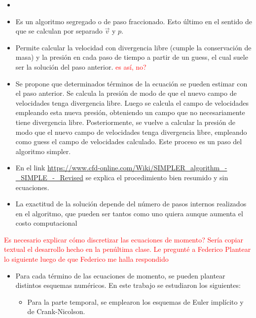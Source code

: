 \documentclass[aps,prb,twocolumn,superscriptaddress,floatfix,longbibliography,10pt]{revtex4-2}
\newif\ifptitle
\newif\ifpnumber
\newcounter{para}
\newcommand\ptitle[1]{\par\refstepcounter{para}
{\ifpnumber{\noindent\textcolor{lightgray}{\textbf{\thepara}}\indent}\fi}
{\ifptitle{\textbf{[{#1}]}}\fi}}
\begin{document}
\ptitle{Algoritmo simpler simplificadamente}
\begin{itemize}
  \item \cite{Patankar}
  \item Es un algoritmo segregado o de paso fraccionado. Esto último en el sentido de que se calculan por separado $\vec{v}$ y $p$.
  \item Permite calcular la velocidad con divergencia libre (cumple la conservación de masa) y la presión en cada paso de tiempo a partir de un guess, el cual suele ser la solución del paso anterior. \textcolor{red}{es así, no?}
  \item Se propone que determinados términos de la ecuación se pueden estimar con el paso anterior. Se calcula la presión de modo de que el nuevo campo de velocidades tenga divergencia libre. Luego se calcula el campo de velocidades empleando esta nueva presión, obteniendo un campo que no necesariamente tiene divergencia libre. Posteriormente, se vuelve a calcular la presión de modo que el nuevo campo de velocidades tenga divergencia libre, empleando como guess el campo de velocidades calculado. Este proceso es un paso del algoritmo simpler.
  \item En el link \url{https://www.cfd-online.com/Wiki/SIMPLER_algorithm_-_SIMPLE_-_Revised} se explica el procedimiento bien resumido y sin ecuaciones.
  \item La exactitud de la solución depende del número de pasos internos realizados en el algoritmo, que pueden ser tantos como uno quiera aunque aumenta el costo computacional
\end{itemize}



\textcolor{red}{Es necesario explicar cómo discretizar las ecuaciones de momento? Sería copiar textual el desarrollo hecho en la penúltima clase. Le pregunté a Federico}
\textcolor{red}{Plantear lo siguiente luego de que Federico me halla respondido}

\ptitle{Esquemas numéricos posibles para cada término}
\begin{itemize}
  \item Para cada término de las ecuaciones de momento, se pueden plantear distintos esquemas numéricos. En este trabajo se estudiaron los siguientes:
  \begin{itemize}
    \item Para la parte temporal, se emplearon los esquemas de Euler implícito y de Crank-Nicolson.
  \end{itemize}
\end{itemize}
\end{document}
